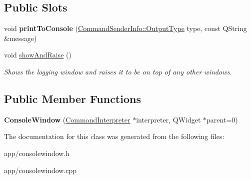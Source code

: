 \subsection*{Public Slots}
\begin{DoxyCompactItemize}
\item 
\hypertarget{class_console_window_ae9673d9006ba0e1d31d6432ae590ff6e}{void {\bfseries print\-To\-Console} (\hyperlink{class_command_sender_info_a3a5e6a2ef1772f6557f351652c2e3b60}{Command\-Sender\-Info\-::\-Output\-Type} type, const Q\-String \&message)}\label{class_console_window_ae9673d9006ba0e1d31d6432ae590ff6e}

\item 
\hypertarget{class_console_window_a94b2b50c6896d6ebea168a5aac29a5fa}{void \hyperlink{class_console_window_a94b2b50c6896d6ebea168a5aac29a5fa}{show\-And\-Raise} ()}\label{class_console_window_a94b2b50c6896d6ebea168a5aac29a5fa}

\begin{DoxyCompactList}\small\item\em Shows the logging window and raises it to be on top of any other windows. \end{DoxyCompactList}\end{DoxyCompactItemize}
\subsection*{Public Member Functions}
\begin{DoxyCompactItemize}
\item 
\hypertarget{class_console_window_af6b333d802186fc620a66563f415e89c}{{\bfseries Console\-Window} (\hyperlink{class_command_interpreter}{Command\-Interpreter} $\ast$interpreter, Q\-Widget $\ast$parent=0)}\label{class_console_window_af6b333d802186fc620a66563f415e89c}

\end{DoxyCompactItemize}


The documentation for this class was generated from the following files\-:\begin{DoxyCompactItemize}
\item 
app/consolewindow.\-h\item 
app/consolewindow.\-cpp\end{DoxyCompactItemize}

